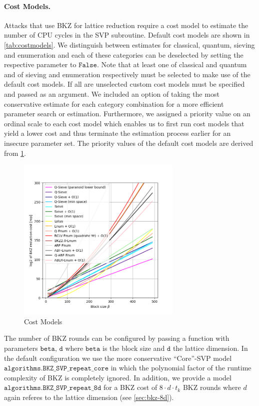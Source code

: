 \paragraph{Cost Models.} Attacks that use BKZ for lattice reduction require a cost model to estimate the number of CPU cycles in the SVP subroutine. Default cost models are shown in \cref{tab:costmodels}. We distinguish between estimates for classical, quantum, sieving and enumeration and each of these categories can be deselected by setting the respective parameter to $\texttt{False}$. Note that at least one of classical and quantum and of sieving and enumeration respectively must be selected to make use of the default cost models. If all are unselected custom cost models must be specified and passed as an argument. We included an option of taking the most conservative estimate for each category combination for a more efficient parameter search or estimation. Furthermore, we assigned a priority value on an ordinal scale to each cost model which enables us to first run cost models that yield a lower cost and thus terminate the estimation process earlier for an insecure parameter set. The priority values of the default cost models are derived from \cref{fig:costmodels}.
\begin{figure}[h]
    \centering
    \includegraphics[width=0.7\textwidth]{graphics/cost_models.png}
    \caption{Cost Models}\label{fig:costmodels}
\end{figure}
The number of BKZ rounds can be configured by passing a function with parameters $\texttt{beta, d}$ where $\texttt{beta}$ is the block size and $\texttt{d}$ the lattice dimension. In the default configuration we use the more conservative ``Core''-SVP model $\texttt{algorithms.BKZ\_SVP\_repeat\_core}$ \cite{ADPS16} in which the polynomial factor of the runtime complexity of BKZ is completely ignored. In addition, we provide a model $\texttt{algorithms.BKZ\_SVP\_repeat\_8d}$ for a BKZ cost of $8 \cdot d \cdot t_k$ BKZ rounds where $d$ again referes to the lattice dimension (see \cref{sec:bkz-8d}).


